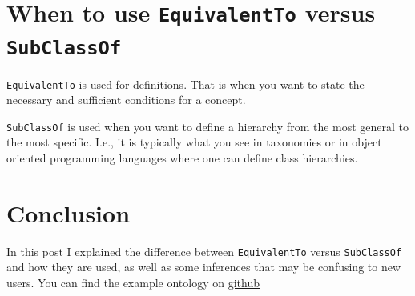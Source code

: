 \documentclass{amsart}
\begin{document}
\section{When to use \texttt{EquivalentTo} versus \texttt{SubClassOf}}
\texttt{EquivalentTo} is used for definitions. That is when you want to state the necessary and sufficient conditions for a concept.

\texttt{SubClassOf} is used when you want to define a hierarchy from the most general to the most specific. I.e., it is typically what you see in taxonomies or in object oriented programming languages where one can define class hierarchies.

\section{Conclusion}
In this post I explained the difference between \texttt{EquivalentTo} versus \texttt{SubClassOf} and how they are used, as well as some inferences that
may be confusing to new users. You can find the example ontology on \href{https://github.com/henrietteharmse/henrietteharmse/tree/master/blog/tutorial/ontologies/examples}{github}
  
  
  
 
\end{document}
